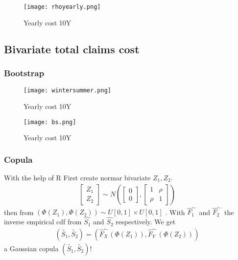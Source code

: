 \documentclass[11pt]{article}
\begin{document}
 \begin{figure}[H]
 \center
  \texttt{[image: rhoyearly.png]}
  \caption{Yearly cost 10Y}
  \label{fig:samplefig10y}
\end{figure}



\subsection*{Bivariate total claims cost}

\subsubsection*{Bootstrap}


 \begin{figure}[H]
 \center
  \texttt{[image: wintersummer.png]}
  \caption{Yearly cost 10Y}
  \label{fig:season}
\end{figure}

 \begin{figure}[H]
 \center
  \texttt{[image: bs.png]}
  \caption{Yearly cost 10Y}
  \label{fig:season}
\end{figure}

\subsubsection*{Copula}
With the help of R 
First create normar bivariate $Z_1,Z_2$.
\begin{align} \label{eq:bi1}
	 \begin{bmatrix} Z_1 \\ Z_2\end{bmatrix} \sim N\left(\begin{bmatrix} 0 \\ 0\end{bmatrix},\begin{bmatrix} 1&\rho \\ \rho&1\end{bmatrix}\right)
\end{align}
then from   $\left(\Phi(Z_1),\Phi(Z_2)\right) \sim  U[0,1] \times U[0,1]$ .
With $\hat{F}_1^\leftharpoonup$ and $\hat{F}_2^\leftharpoonup$ the inverse empirical cdf from $\hat{S_1}$ and $\hat{S_2}$ respectively.
We get
\begin{align} \label{eq:bi3}
	  \left(\tilde{S_1},\tilde{S_2}\right) = \left(\hat{F}_X^\leftharpoonup(\Phi(Z_1)),\hat{F}_Y^\leftharpoonup(\Phi(Z_2))\right) 
\end{align}
a Gaussian copula $ \left(\tilde{S_1},\tilde{S_2}\right)$!
\end{document}
